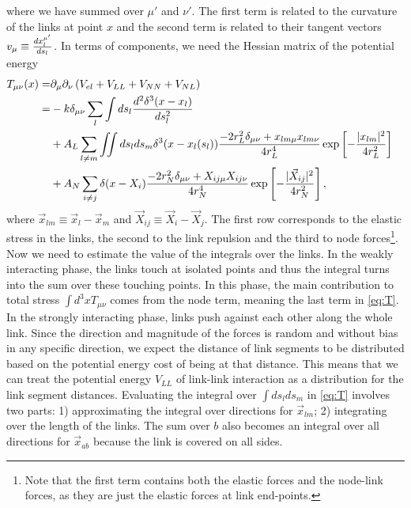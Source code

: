 \documentclass[endfloats,nofootinbib,preprint,floatfix,titlepage,superscriptaddress,linenumbers]{revtex4-1} %
\begin{document}
where we have summed over $\mu'$ and $\nu'$. 
The first term is related to the curvature of the links at point $x$ and the second term is related to their tangent vectors $v_\mu \equiv {d x_l^{\mu'}\over ds_l}$.  
In terms of components, we need the Hessian matrix of the potential energy
\begin{align}
    T_{\mu\nu}(x) =&  %
    \ro_\mu \ro_\nu \pr{V_{el}+V_{LL} + V_{NN}+V_{NL}} \cr
    =& %
    -{k}\delta_{\mu\nu} \sum_l\int ds_l {d^2 \delta^3(x-x_l)\over ds_l^2} \cr
    & + A_L \sum_{l\ne m} \iint ds_l ds_m \delta^3(x-x_l(s_l))\frac{-2r_L^2\delta_{\mu\nu}+ x_{lm\mu} x_{lm\nu}}{4r_L^4}
     \exp\left[- {|x_{lm}|^2 \over 4 r_L^2}\right]\cr
    &+ A_N\sum_{i\ne j}\delta(x-X_i)\frac{-2r_N^2\delta_{\mu\nu}+ X_{ij\mu}X_{ij\nu}}{4r_N^4}
    \exp\left[- {|\vec{X}_{ij}|^2 \over 4 r_N^2}\right],
    \label{eq:T}
\end{align}
where $\vec{x}_{lm} \equiv \vec{x}_l-\vec{x}_m$ and $\vec{X}_{ij} \equiv \vec{X}_i-\vec{X}_j$. The first row corresponds to the elastic stress in the links, the second to the link repulsion and the third to node forces\footnote{
Note that the first term contains both the elastic forces and the node-link forces, as they are just the elastic forces at link end-points.}. 
Now we need to estimate the value of the integrals over the links.
In the weakly interacting phase, the links touch at isolated points and thus the integral turns into the sum over these touching points. 
In this phase, the main contribution to total stress $\int d^3 x T_{\mu\nu}$ comes from the node term, meaning the last term in \eqref{eq:T}. 
In the strongly interacting phase, links push against each other along the whole link. 
Since the direction and magnitude of the forces is random and without bias in any specific direction, we expect the distance of link segments to be distributed based on the potential energy cost of being at that distance. 
This means that we can treat the potential energy $V_{LL}$ of link-link interaction as a distribution for the link segment distances. 
Evaluating the integral over $\int ds_lds_m$ in \eqref{eq:T} involves two parts: 1) approximating the integral over directions for $\vec{x}_{lm}$; 2) integrating over the length of the links. 
The sum over $b$ also becomes an integral over all directions for $\vec{x}_{ab}$ because the link is covered on all sides. 
\end{document}
